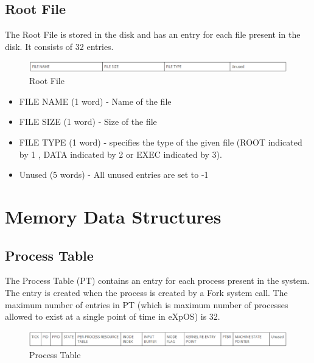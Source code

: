 \subsection{Root File}

The Root File is stored in the disk and has an entry for each file present in the disk. It consists of 32 entries.

\begin{figure}[ht]
\centering
\includegraphics  [scale=0.55]{figures/ROOT.png}
\caption{\footnotesize Root File}
\end{figure}

\begin{itemize}

\item FILE NAME (1 word) - Name of the file
\item FILE SIZE (1 word) - Size of the file
\item FILE TYPE (1 word) - specifies the type of the given file (ROOT indicated by 1 , DATA indicated by 2 or EXEC indicated by 3).
\item Unused (5 words) - All unused entries are set to -1
\end{itemize}

\section {Memory Data Structures}

\subsection{Process Table}

The Process Table (PT) contains an entry for each process present in the system. The entry is created when the process is created by a Fork system call. The maximum number of entries in PT (which is maximum number of processes allowed to exist at a single point of time in eXpOS) is 32.

\begin{figure}[ht]
\centering
\includegraphics  [scale=0.55]{figures/pt.png}
\caption{\footnotesize Process Table}
\end{figure}


